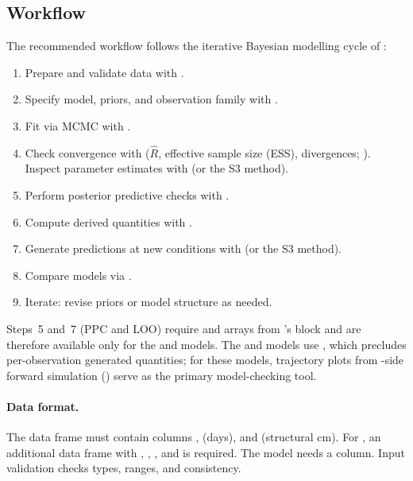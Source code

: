 \documentclass[article,shortnames]{jss}
\begin{document}
\subsection{Workflow} \label{sec:workflow}

The recommended workflow follows the iterative Bayesian modelling cycle
of \citet[Ch.~6]{GelmanBDA2013}:
\begin{enumerate}
  \item Prepare and validate data with .
  \item Specify model, priors, and observation family with
    .
  \item Fit via MCMC with .
  \item Check convergence with 
    ($\hat{R}$, effective sample size (ESS), divergences;
    \citealp{VehtariRhat2021}).
    Inspect parameter estimates with  (or
    the S3  method).
  \item Perform posterior predictive checks with 
    \citep{GabryPPC2019}.
  \item Compute derived quantities with .
  \item Generate predictions at new conditions with
     (or the S3  method).
  \item Compare models via 
    \citep{VehtariLOO2017}.
  \item Iterate: revise priors or model structure as needed.
\end{enumerate}
\noindent
Steps~5 and~7 (PPC and LOO) require  and
 arrays from 's  block and are therefore available only for the
 and  models.  The
 and  models use
, which precludes per-observation generated
quantities; for these models, trajectory plots from -side forward
simulation () serve as the
primary model-checking tool.

\paragraph{Data format.}
The  data frame must contain columns ,
 (days), and  (structural cm).  For
, an additional  data frame
with , , , and  is
required.  The  model needs a 
column.  Input validation checks types, ranges, and consistency.
\end{document}
